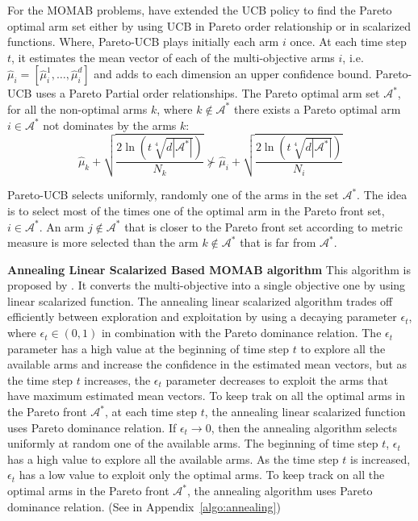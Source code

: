 For the MOMAB problems, \cite{drugan2013designing} have extended the UCB policy to find the Pareto optimal arm set either by using UCB in Pareto order relationship or in scalarized functions. Where, Pareto-UCB plays initially each arm $i$ once. At each time step $t$, it estimates the mean vector of each of the multi-objective arms $i$, i.e. $\hat{\mu}_i = [\hat{\mu}_i^1,\dots,\hat{\mu}_i^d]$ and adds to each dimension an upper confidence bound. Pareto-UCB uses a Pareto Partial order relationships. The Pareto optimal arm set $\mathscr{A}^{\ast}$, for all the non-optimal arms $k$, where $k\notin \mathscr{A}^{\ast}$ there exists a Pareto optimal arm $i\in \mathscr{A}^{\ast}$ not dominates by the arms $k$:
\[\hat{\mu}_k + \sqrt{\frac{2\ln{(t \sqrt[4]{d|\mathscr{A}^{\ast}|})}}{N_k}} \nsucc \hat{\mu}_i + \sqrt{\frac{2\ln{(t\sqrt[4]{d|\mathscr{A}^{\ast}|})}}{N_i}}\]

Pareto-UCB selects uniformly, randomly one of the arms in the set $\mathscr{A}^{\ast}$. The idea is to select most of the times one of the optimal arm in the Pareto front set, $i\in \mathscr{A}^{\ast}$. An arm $j \notin \mathscr{A}^{\ast}$ that is closer to the Pareto front set according to metric measure is more selected than the arm $k\notin \mathscr{A}^{\ast}$ that is far from $\mathscr{A}^{\ast}$.

\vspace{3ex}
\textbf{Annealing Linear Scalarized Based MOMAB algorithm}
This algorithm is proposed by \cite{yahyaa2014scalarized}. It  converts the multi-objective into a single objective one by using linear scalarized function. The annealing linear scalarized algorithm trades off efficiently between exploration and exploitation by using a decaying parameter $\epsilon_t$, where $\epsilon_t\in(0,1)$ in combination with the Pareto dominance relation. The $\epsilon_t$ parameter has a high value at the beginning of time step $t$ to explore all the available arms and increase the confidence in the estimated mean vectors, but as the time step $t$ increases, the $\epsilon_t$ parameter decreases to exploit the arms that have maximum estimated mean vectors. To keep trak on all the optimal arms in the Pareto front $\mathscr{A}^{\ast}$, at each time step $t$, the annealing linear scalarized function uses Pareto dominance relation. If $\epsilon_t \rightarrow 0$, then the annealing algorithm selects uniformly at random one of the available arms. The beginning of time step $t$, $\epsilon_t$ has a high value to explore all the available arms. As the time step $t$ is increased, $\epsilon_t$ has a low value to exploit only the optimal arms. To keep track on all the optimal arms in the Pareto front $\mathscr{A}^{\ast}$, the annealing algorithm uses Pareto dominance relation. (See in Appendix~\ref{algo:annealing})